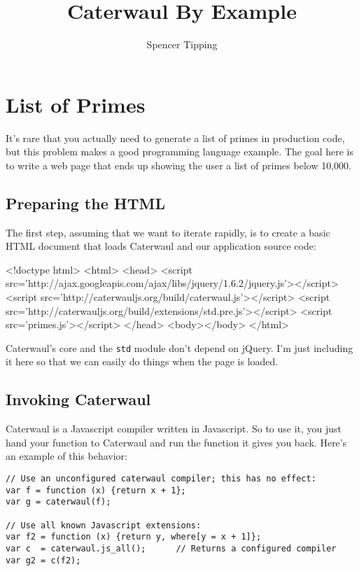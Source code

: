 \documentclass{report}
\title{Caterwaul By Example}
\author{Spencer Tipping}
\begin{document}
\maketitle{}
\tableofcontents{}

\chapter{List of Primes}\label{sec:list-of-primes}
  It's rare that you actually need to generate a list of primes in production code, but this problem makes a good programming language example. The goal here is to write a web page that ends
  up showing the user a list of primes below 10,000.

\section{Preparing the HTML}
    The first step, assuming that we want to iterate rapidly, is to create a basic HTML document that loads Caterwaul and our application source code:

\begin{resourcecode}
<!doctype html>
<html>
  <head>
  <script src='http://ajax.googleapis.com/ajax/libs/jquery/1.6.2/jquery.js'></script>
  <script src='http://caterwauljs.org/build/caterwaul.js'></script>
  <script src='http://caterwauljs.org/build/extensions/std.pre.js'></script>
  <script src='primes.js'></script>
  </head>
  <body></body>
</html> \end{resourcecode}

    Caterwaul's core and the {\tt std} module don't depend on jQuery. I'm just including it here so that we can easily do things when the page is loaded.

\section{Invoking Caterwaul}
    Caterwaul is a Javascript compiler written in Javascript. So to use it, you just hand your function to Caterwaul and run the function it gives you back. Here's an example of this behavior:

\begin{verbatim}
// Use an unconfigured caterwaul compiler; this has no effect:
var f = function (x) {return x + 1};
var g = caterwaul(f);

// Use all known Javascript extensions:
var f2 = function (x) {return y, where[y = x + 1]};
var c  = caterwaul.js_all();      // Returns a configured compiler
var g2 = c(f2);
\end{verbatim}
\end{document}
